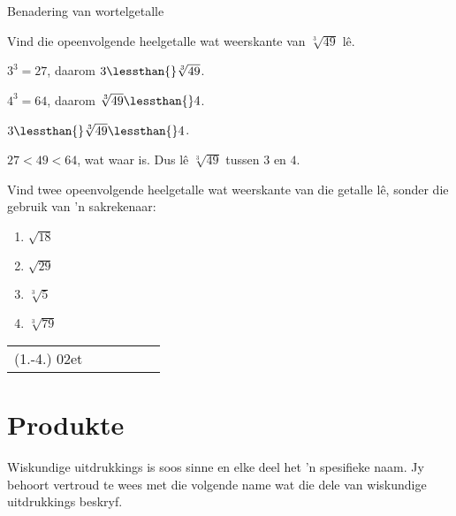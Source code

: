 \begin{wex}{Benadering van wortelgetalle }{

Vind die opeenvolgende heelgetalle wat weerskante van $\sqrt[3]{49}$ lê.
}
{
   ${3}^{3}=27$, daarom $3\lessthan{}\sqrt[3]{49}$.

 ${4}^{3}=64$, daarom $\sqrt[3]{49}\lessthan{}4$. 

$3\lessthan{}\sqrt[3]{49}\lessthan{}4$.

$27<49<64$, wat waar is. Dus lê $\sqrt[3]{49}$ tussen $3$ en $4$.
}
\end{wex}

\begin{exercises}{}
 {
Vind twee opeenvolgende heelgetalle wat weerskante van die getalle lê, sonder die gebruik van 'n sakrekenaar:
\begin{enumerate}[itemsep=5pt, label=\textbf{\arabic*}. ]
\item $\sqrt{18}$
\item $\sqrt{29}$
\item $\sqrt[3]{5}$
\item $\sqrt[3]{79}$

\end{enumerate}
\par \practiceinfo
\par \begin{tabular}[h]{cccccc}
(1.-4.)	02et	&


\end{tabular}
}
\end{exercises}



\section{Produkte}
\setcounter{figure}{1}
\setcounter{subfigure}{1}

%   
\nopagebreak
Wiskundige uitdrukkings is soos sinne en elke deel het ’n spesifieke naam. Jy behoort vertroud te wees met die volgende name wat die dele van wiskundige uitdrukkings beskryf.\par 

